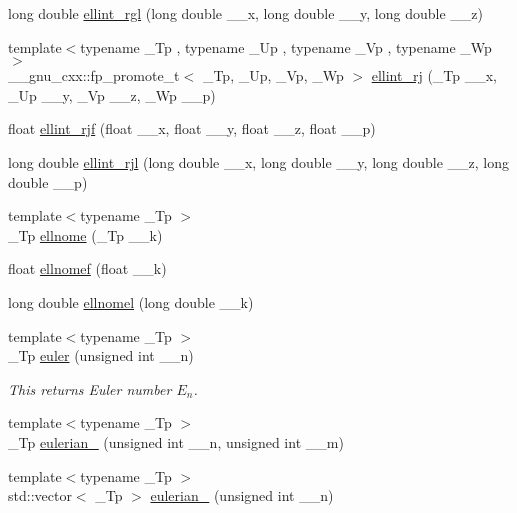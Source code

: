 \begin{DoxyCompactItemize}
long double \hyperlink{group__mathsf__gnu_ga563455d515ed845988552432108a21be}{ellint\+\_\+rgl} (long double \+\_\+\+\_\+x, long double \+\_\+\+\_\+y, long double \+\_\+\+\_\+z)
\item 
{\footnotesize template$<$typename \+\_\+\+Tp , typename \+\_\+\+Up , typename \+\_\+\+Vp , typename \+\_\+\+Wp $>$ }\\\+\_\+\+\_\+gnu\+\_\+cxx\+::fp\+\_\+promote\+\_\+t$<$ \+\_\+\+Tp, \+\_\+\+Up, \+\_\+\+Vp, \+\_\+\+Wp $>$ \hyperlink{group__mathsf__gnu_gadccabc8df929cc03745286ed1574a3ba}{ellint\+\_\+rj} (\+\_\+\+Tp \+\_\+\+\_\+x, \+\_\+\+Up \+\_\+\+\_\+y, \+\_\+\+Vp \+\_\+\+\_\+z, \+\_\+\+Wp \+\_\+\+\_\+p)
\item 
float \hyperlink{group__mathsf__gnu_gace85b5190b04f57493878c5d672cfabd}{ellint\+\_\+rjf} (float \+\_\+\+\_\+x, float \+\_\+\+\_\+y, float \+\_\+\+\_\+z, float \+\_\+\+\_\+p)
\item 
long double \hyperlink{group__mathsf__gnu_gab5405f1669b3ce8b560dc33aa5b97287}{ellint\+\_\+rjl} (long double \+\_\+\+\_\+x, long double \+\_\+\+\_\+y, long double \+\_\+\+\_\+z, long double \+\_\+\+\_\+p)
\item 
{\footnotesize template$<$typename \+\_\+\+Tp $>$ }\\\+\_\+\+Tp \hyperlink{group__mathsf__gnu_ga7bfb34f8b5c0ed7c72040f9cb7034bba}{ellnome} (\+\_\+\+Tp \+\_\+\+\_\+k)
\item 
float \hyperlink{group__mathsf__gnu_gad3ba08e5843ea0ec2bb9ddde3033adff}{ellnomef} (float \+\_\+\+\_\+k)
\item 
long double \hyperlink{group__mathsf__gnu_ga0774570b24f654f8ae39e1865613a4e2}{ellnomel} (long double \+\_\+\+\_\+k)
\item 
{\footnotesize template$<$typename \+\_\+\+Tp $>$ }\\\+\_\+\+Tp \hyperlink{group__mathsf__gnu_gac956e6457ab7d0d1765d281e73073f55}{euler} (unsigned int \+\_\+\+\_\+n)
\begin{DoxyCompactList}\small\item\em This returns Euler number $ E_n $. \end{DoxyCompactList}\item 
{\footnotesize template$<$typename \+\_\+\+Tp $>$ }\\\+\_\+\+Tp \hyperlink{group__mathsf__gnu_gadfd8810a97655d2cdd1b0e3af68a79d3}{eulerian\+\_} (unsigned int \+\_\+\+\_\+n, unsigned int \+\_\+\+\_\+m)
\item 
{\footnotesize template$<$typename \+\_\+\+Tp $>$ }\\std\+::vector$<$ \+\_\+\+Tp $>$ \hyperlink{group__mathsf__gnu_ga6597229d2557ccf12fd9c50a66919ceb}{eulerian\+\_} (unsigned int \+\_\+\+\_\+n)

\end{DoxyCompactItemize}
